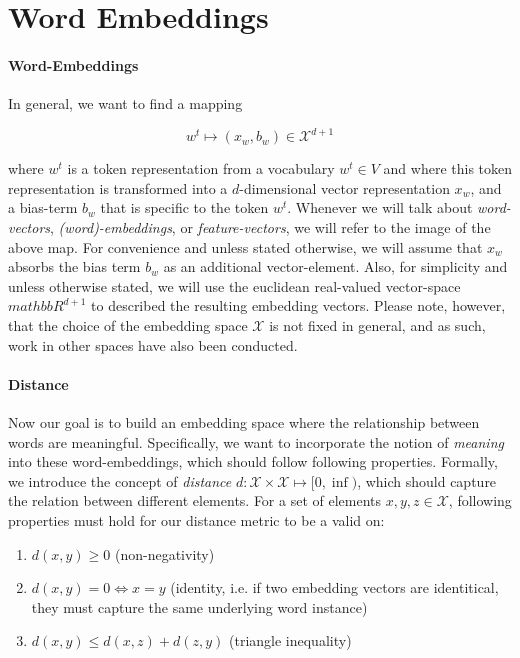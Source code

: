 \documentclass[a4paper,12pt,twoside,openright]{report}
\begin{document}
\section{Word Embeddings}

\paragraph{Word-Embeddings}
In general, we want to find a mapping 

\begin{equation}
w^t \mapsto (x_w, b_w) \in \mathcal{X}^{d + 1}
\end{equation}{\label{map:embedding_mapping}}

where $w^t$ is a token representation from a vocabulary $w^t \in V$ and where this token representation is transformed into a $d$-dimensional vector representation $x_w$, and a bias-term $b_w$ that is specific to the token $w^t$.
Whenever we will talk about \textit{word-vectors}, \textit{(word)-embeddings}, or \textit{feature-vectors}, we will refer to the image of the above map. 
For convenience and unless stated otherwise, we will assume that $x_w$ absorbs the bias term $b_w$ as an additional vector-element.
Also, for simplicity and unless otherwise stated, we will use the euclidean real-valued vector-space $mathbb{R}^{d+1}$ to described the resulting embedding vectors.
Please note, however, that the choice of the embedding space $\mathcal{X}$ is not fixed in general, and as such, work in other spaces have also been conducted. 


\paragraph{Distance} Now our goal is to build an embedding space where the relationship between words are meaningful.
Specifically, we want to incorporate the notion of \textit{meaning} into these word-embeddings, which should follow following properties.
Formally, we introduce the concept of \textit{distance} $d : \mathcal{X}  \times \mathcal{X} \mapsto [ 0, \inf )$, which should capture the relation between different elements. 
For a set of elements $x, y, z \in \mathcal{X}$, following properties must hold for our distance metric to be a valid on:

\begin{enumerate}
\item $d(x, y) \geq 0$ (non-negativity)
\item $d(x, y) = 0 \iff x = y$ (identity, i.e. if two embedding vectors are identitical, they must capture the same underlying word instance)
\item $d(x, y) \leq d(x, z) + d(z, y)$ (triangle inequality)
\end{enumerate}{\label{def:distance}}
\end{document}
